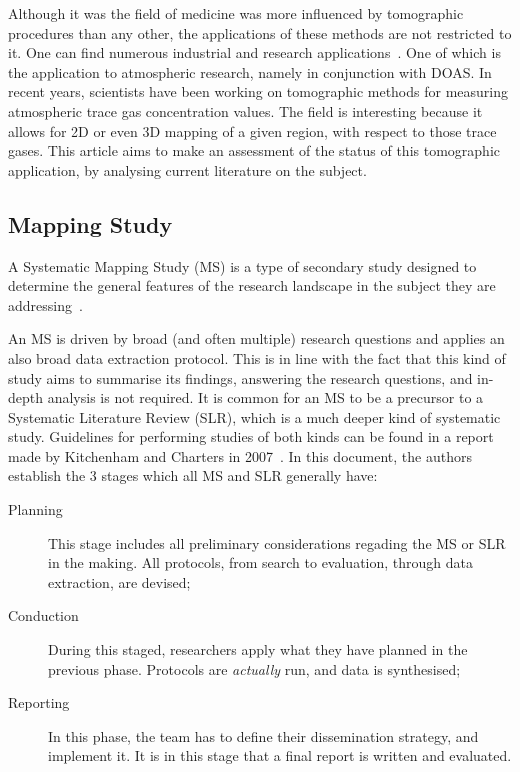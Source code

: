 Although it was the field of medicine was more influenced by tomographic
procedures than any other, the applications of these methods are not
restricted to it. One can find numerous industrial and research
applications~\cite{Wang2015, Haisch2012, Byer1979}. One of which is the
application to atmospheric research, namely in conjunction with DOAS. In
recent years, scientists have been working on tomographic methods for
measuring atmospheric trace gas concentration values. The field is
interesting because it allows for 2D or even 3D mapping of a given
region, with respect to those trace gases. This article aims to make an
assessment of the status of this tomographic application, by analysing
current literature on the subject. 



\subsection{Mapping Study}
\label{sub:mapping_study}

A Systematic Mapping Study (MS) is a type of secondary study designed to
determine the general features of the research landscape in the subject
they are addressing~\cite{Kitchenham2007, Petersen2008}.

An MS is driven by broad (and often multiple) research questions and
applies an also broad data extraction protocol. This is in line with the
fact that this kind of study aims to summarise its findings, answering
the research questions, and in-depth analysis is not required. It is
common for an MS to be a precursor to a Systematic Literature Review
(SLR), which is a much deeper kind of systematic study. Guidelines for
performing studies of both kinds can be found in a report made by
Kitchenham and Charters in 2007~\cite{Kitchenham2007}. In this document,
the authors establish the 3 stages which all MS and SLR generally have:

\begin{description}
    \item[Planning] This stage includes all preliminary considerations
        regading the MS or SLR in the making. All protocols, from search
        to evaluation, through data extraction, are devised;
    \item[Conduction] During this staged, researchers apply what they
        have planned in the previous phase. Protocols are
        \emph{actually} run, and data is synthesised;
    \item[Reporting] In this phase, the team has to define their
        dissemination strategy, and implement it. It is in this stage
        that a final report is written and evaluated.
\end{description}

